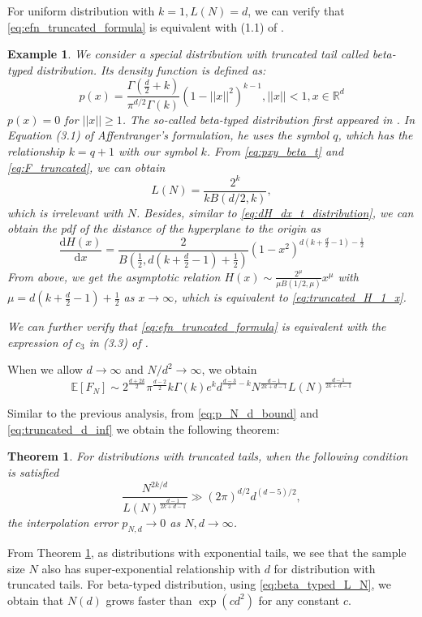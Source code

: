 \documentclass[conference,a4paper]{IEEEtran}
\def\E{\mathbb{E}}
\def\d{\mathrm{d}}
\newtheorem{example}{Example}
\newtheorem{theorem}{Theorem}
\begin{document}
 For uniform distribution with $k=1, L(N)=d$, we can verify that
 \eqref{eq:efn_truncated_formula} is equivalent with (1.1)
 of \cite{raynaud1970enveloppe}.
 \begin{example}
  We consider a special distribution with truncated tail called
  beta-typed distribution. Its density function is defined as:
  \begin{equation}\label{eq:pxy_beta_t}
    p(x) = \frac{\Gamma(\frac{d}{2}+ k)}{\pi^{d/2} \Gamma(k)} (1-||x||^2)^{k-1},
    ||x|| <1, x \in \mathbb{R}^d
\end{equation}
 $p(x)=0$ for $||x||\geq 1$.
 The so-called beta-typed distribution first appeared in \cite{affentranger1991convex}.
 In Equation (3.1) of Affentranger's formulation,
 he uses the symbol $q$, which has the relationship  $k=q+1$ with our symbol $k$.
 From \eqref{eq:pxy_beta_t} and \eqref{eq:F_truncated}, we can obtain
 \begin{equation}\label{eq:beta_typed_L_N}
  L(N)=\frac{2^k}{kB(d/2,k)},
 \end{equation}
 which is irrelevant with $N$.
 Besides, similar to \eqref{eq:dH_dx_t_distribution},
 we can obtain the pdf of the distance of the hyperplane to the origin as
\begin{equation}
     \frac{\d H(x)}{\d x} = \frac{2}{B(\frac{1}{2}, d(k+\frac{d}{2}-1)+\frac{1}{2})}\left(1 -x^2\right)^{d(k+\frac{d}{2}-1)-\frac{1}{2}} 
\end{equation}
From above, we get the asymptotic relation $H(x) \sim \frac{2^{\mu}}{\mu B(1/2, \mu)}
x^{\mu}$ with $\mu=d(k+\frac{d}{2}-1)+\frac{1}{2}$ as $x\to \infty$,
which is equivalent to \eqref{eq:truncated_H_1_x}.

 We can further verify that
 \eqref{eq:efn_truncated_formula} is equivalent with the expression of $c_3$
 in (3.3) of \cite{affentranger1991convex}.
 \end{example}
 When we allow $d\to \infty$ and $N/d^2 \to \infty$, we obtain
 \begin{equation}\label{eq:truncated_d_inf}
  \E[F_N] \sim 2^{\frac{d+2k}{2}}\pi^{\frac{d-2}{2}} k\Gamma(k)e^k d^{\frac{d-3}{2}-k}
  N^{\frac{d-1}{2k+d-1}} L(N)^{\frac{d-1}{2k+d-1}}
 \end{equation}

 Similar to the previous analysis, from
 \eqref{eq:p_N_d_bound} and \eqref{eq:truncated_d_inf} we obtain
 the following theorem:
 \begin{theorem}\label{thm:truncated_tails_sample}
  For distributions with truncated tails,
  when the following condition is satisfied
  \begin{equation}
    \frac{N^{2k/d}}{L(N)^{\frac{d-1}{2k+d-1}}}
        \gg (2\pi)^{d/2}d^{(d-5)/2},
  \end{equation}
  the interpolation error $p_{N,d} \to 0$ as $N,d\to \infty$.
\end{theorem}
From Theorem \ref{thm:truncated_tails_sample}, as
distributions with exponential tails, we see that
the sample size $N$ also has super-exponential relationship
with $d$ for distribution with truncated tails.
For beta-typed distribution, using \eqref{eq:beta_typed_L_N},
we obtain that $N(d)$
grows faster than $\exp(cd^2)$ for any constant $c$.
\end{document}

